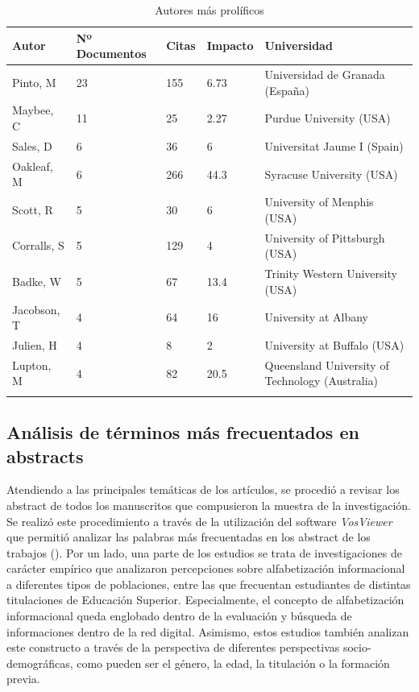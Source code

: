 \documentclass{textolivre}
\begin{document}
\begin{table}[h]
\caption{Autores más prolíficos}
\label{tab4}
\centering
\scriptsize
\begin{tabular}{%
    p{}%
    p{}%
    p{}%
    p{}%
    >{\raggedright\arraybackslash}p{}}
\toprule 
Autor & Nº Documentos & Citas & Impacto & Universidad
\\
\midrule
\arrayrulecolor[gray]{.7}
Pinto, M & 23 & 155 & 6.73 & Universidad de Granada (España)
\\
Maybee, C &	11 & 25 & 2.27 & Purdue University (USA)
\\
Sales, D & 6 & 36 & 6 & Universitat Jaume I (Spain)
\\
Oakleaf, M & 6 & 266 & 44.3 & Syracuse University (USA)
\\
Scott, R & 5 & 30 & 6 & University of Menphis (USA)
\\
Corralls, S & 5 & 129 & 4 & University of Pittsburgh (USA)
\\
Badke, W & 5 & 67 & 13.4 & Trinity Western University (USA)
\\
Jacobson, T & 4 & 64 & 16 & University at Albany
\\
Julien, H & 4 & 8 & 2 & University at Buffalo (USA)
\\
Lupton, M & 4 & 82 & 20.5 & Queensland University of Technology (Australia)
\\
\arrayrulecolor{black}
\bottomrule
\end{tabular}
\centering
{}
\end{table}



\subsection{Análisis de términos más frecuentados en abstracts}
Atendiendo a las principales temáticas de los artículos, se procedió a revisar los abstract de todos los manuscritos que compusieron la muestra de la investigación. Se realizó este procedimiento a través de la utilización del software \emph{VosViewer} que permitió analizar las palabras más frecuentadas en los abstract de los trabajos (). Por un lado, una parte de los estudios se trata de investigaciones de carácter empírico que analizaron percepciones sobre alfabetización informacional a diferentes tipos de poblaciones, entre las que frecuentan estudiantes de distintas titulaciones de Educación Superior. Especialmente, el concepto de alfabetización informacional queda englobado dentro de la evaluación y búsqueda de informaciones dentro de la red digital. Asimismo, estos estudios también analizan este constructo a través de la perspectiva de diferentes perspectivas socio-demográficas, como pueden ser el género, la edad, la titulación o la formación previa.
\end{document}
